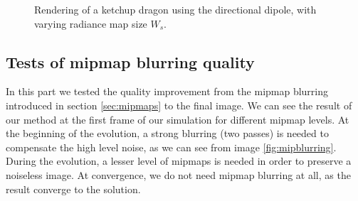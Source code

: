 \begin{figure}
{	\label{fig:pathdragonsize1024}
}
\label{fig:pathdragonsize}
\caption{Rendering of a ketchup dragon using the directional dipole, with varying radiance map size $W_s$.}
\end{figure}

\FloatBarrier
\subsection{Tests of mipmap blurring quality}

In this part we tested the quality improvement from the mipmap blurring introduced in section \ref{sec:mipmaps} to the final image. We can see the result of our method at the first frame of our simulation for different mipmap levels. At the beginning of the evolution, a strong blurring (two passes) is needed to compensate the high level noise, as we can see from image \ref{fig:mipblurring}. During the evolution, a lesser level of mipmaps is needed in order to preserve a noiseless image. At convergence, we do not need mipmap blurring at all, as the result converge to the solution. 
